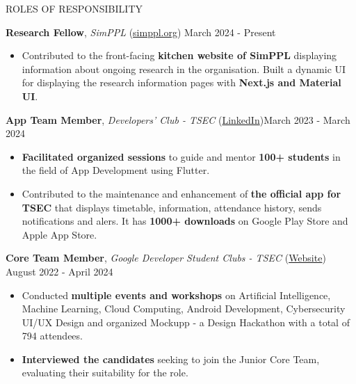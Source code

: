 \documentclass{resume} %
\begin{document}
\begin{rSection}{ROLES OF RESPONSIBILITY}

    \textbf{Research Fellow}, \textit{SimPPL} (\href{https://simppl.org/}{simppl.org}) \hfill March 2024 - Present
    \begin{itemize}
        \item Contributed to the front-facing \textbf{kitchen website of SimPPL} displaying information about ongoing research in the organisation. Built a dynamic UI for displaying the research information pages with \textbf{Next.js and Material UI}.
    \end{itemize}

    \textbf{App Team Member}, \textit{Developers' Club - TSEC} (\href{https://www.linkedin.com/in/developer-s-club-tsec/}{LinkedIn})\hfill March 2023 - March 2024
    \begin{itemize}
        \itemsep -6pt {}
        \item \textbf{Facilitated organized sessions} to guide and mentor \textbf{100+ students} in the field of App Development using Flutter.
        \item Contributed to the maintenance and enhancement of \textbf{the official app for TSEC} that displays timetable, information, attendance history, sends notifications and alers. It has \textbf{1000+ downloads} on Google Play Store and Apple App Store.
    \end{itemize}

    \textbf{Core Team Member}, \textit{Google Developer Student Clubs - TSEC} (\href{https://gdsc.community.dev/thadomal-shahani-engineering-college-mumbai/}{Website})  \hfill August 2022 - April 2024
    \begin{itemize}
        \itemsep -6pt {}
        \item Conducted \textbf{multiple events and workshops} on Artificial Intelligence, Machine Learning, Cloud Computing, Android Development, Cybersecurity UI/UX Design and organized Mockupp - a Design Hackathon with a total of 794 attendees.
        \item \textbf{Interviewed the candidates} seeking to join the Junior Core Team, evaluating their suitability for the role.
    \end{itemize}

\end{rSection}
\end{document}
